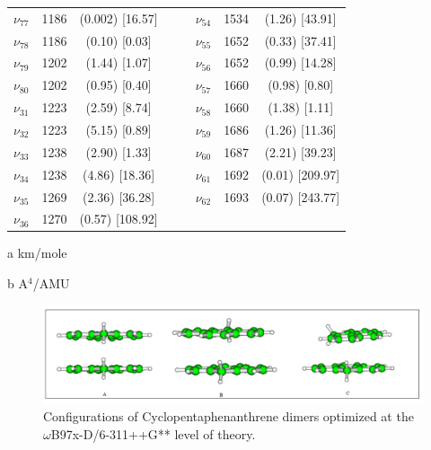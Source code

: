 \begin{table}[H]
\begin{center}
\begin{threeparttable}
\begin{tabular}{c c c c c c c c}
$\nu_{77}$	&	1186&	(0.002)	[16.57]	&	&	&	$\nu_{54}$	&1534	&	(1.26)	[43.91]\\
$\nu_{78}$	&	1186&	(0.10)	[0.03]	&	&	&	$\nu_{55}$	&1652	&	(0.33)	[37.41]\\
$\nu_{79}$	&	1202&	(1.44)	[1.07]	&	&	&	$\nu_{56}$	&1652	&	(0.99)	[14.28]\\
$\nu_{80}$	&	1202&	(0.95)	[0.40]	&	&	&	$\nu_{57}$	&1660	&	(0.98)	[0.80]\\
$\nu_{31}$	&	1223&	(2.59)	[8.74]	&	&	&	$\nu_{58}$	&1660	&	(1.38)	[1.11]\\
$\nu_{32}$	&	1223&	(5.15)	[0.89]	&	&	&	$\nu_{59}$	&1686	&	(1.26)	[11.36]\\
$\nu_{33}$	&	1238&	(2.90)	[1.33]	&	&	&	$\nu_{60}$	&1687	&	(2.21)	[39.23]\\
$\nu_{34}$	&	1238&	(4.86)	[18.36]	&	&	&	$\nu_{61}$	&1692	&	(0.01)	[209.97]\\
$\nu_{35}$	&	1269&(2.36)	[36.28]	&	&	&	$\nu_{62}$	&	1693&	(0.07) [243.77]\\ $\nu_{36}$	&	1270	&	(0.57)	[108.92]	&	&	&	&  &  \\				
					
					\bottomrule
				\end{tabular}
				
				\begin{tablenotes}
					\item[a] km/mole
					\item[b] A$^{4}$/AMU
				\end{tablenotes}
			\end{threeparttable}
		\end{center}
		\label{freq-FluoreneDi}
	\end{table}					


\begin{figure}[H]
	\begin{center}
		\includegraphics[scale=0.9]{anex/image/TCC}
	\end{center}
	\caption{ Configurations of Cyclopentaphenanthrene dimers optimized at the $\omega$B97x-D/6-311++G** level of theory. }
\end{figure}

